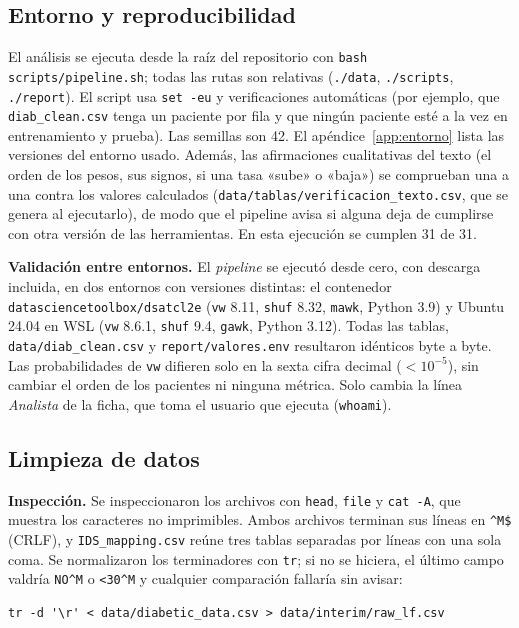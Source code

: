 \documentclass[11pt,a4paper]{article}
\newcommand{\cod}[1]{\texttt{#1}}
\begin{document}
\subsection{Entorno y reproducibilidad}
El análisis se ejecuta desde la raíz del repositorio con \cod{bash scripts/pipeline.sh}; todas las rutas son relativas (\cod{./data}, \cod{./scripts}, \cod{./report}). El script usa \cod{set -eu} y verificaciones automáticas (por ejemplo, que \cod{diab\_clean.csv} tenga un paciente por fila y que ningún paciente esté a la vez en entrenamiento y prueba). Las semillas son 42. El apéndice~\ref{app:entorno} lista las versiones del entorno usado. Además, las afirmaciones cualitativas del texto (el orden de los pesos, sus signos, si una tasa «sube» o «baja») se comprueban una a una contra los valores calculados (\cod{data/tablas/verificacion\_texto.csv}, que se genera al ejecutarlo), de modo que el pipeline avisa si alguna deja de cumplirse con otra versión de las herramientas. En esta ejecución se cumplen 31 de 31.

\textbf{Validación entre entornos.} El \emph{pipeline} se ejecutó desde cero, con descarga incluida, en dos entornos con versiones distintas: el contenedor \cod{datasciencetoolbox/dsatcl2e} (\cod{vw} 8.11, \cod{shuf} 8.32, \cod{mawk}, Python 3.9) y Ubuntu 24.04 en WSL (\cod{vw} 8.6.1, \cod{shuf} 9.4, \cod{gawk}, Python 3.12). Todas las tablas, \cod{data/diab\_clean.csv} y \cod{report/valores.env} resultaron idénticos byte a byte. Las probabilidades de \cod{vw} difieren solo en la sexta cifra decimal ($<10^{-5}$), sin cambiar el orden de los pacientes ni ninguna métrica. Solo cambia la línea \emph{Analista} de la ficha, que toma el usuario que ejecuta (\cod{whoami}).

\subsection{Limpieza de datos}
\textbf{Inspección.} Se inspeccionaron los archivos con \cod{head}, \cod{file} y \cod{cat -A}, que muestra los caracteres no imprimibles. Ambos archivos terminan sus líneas en \cod{\^{}M\$} (CRLF), y \cod{IDS\_mapping.csv} reúne tres tablas separadas por líneas con una sola coma. Se normalizaron los terminadores con \cod{tr}; si no se hiciera, el último campo valdría \cod{NO\^{}M} o \cod{<30\^{}M} y cualquier comparación fallaría sin avisar:
\begin{lstlisting}
tr -d '\r' < data/diabetic_data.csv > data/interim/raw_lf.csv
\end{lstlisting}
\end{document}

